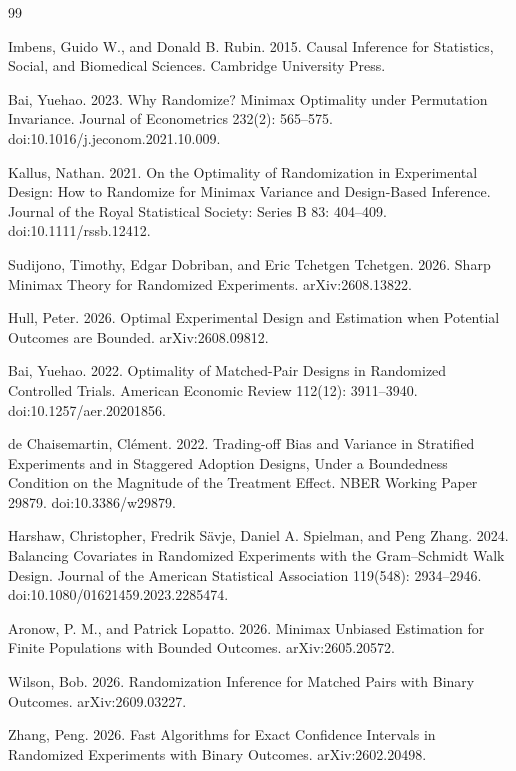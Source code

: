 \documentclass{article}
\begin{document}
\begin{thebibliography}{99}

   Imbens, Guido W., and Donald B. Rubin. 2015. Causal Inference for Statistics, Social, and Biomedical Sciences. Cambridge University Press.

   Bai, Yuehao. 2023. Why Randomize? Minimax Optimality under Permutation Invariance. Journal of Econometrics 232(2): 565--575. doi:10.1016/j.jeconom.2021.10.009.

   Kallus, Nathan. 2021. On the Optimality of Randomization in Experimental Design: How to Randomize for Minimax Variance and Design-Based Inference. Journal of the Royal Statistical Society: Series B 83: 404--409. doi:10.1111/rssb.12412.

   Sudijono, Timothy, Edgar Dobriban, and Eric Tchetgen Tchetgen. 2026. Sharp Minimax Theory for Randomized Experiments. arXiv:2608.13822.

   Hull, Peter. 2026. Optimal Experimental Design and Estimation when Potential Outcomes are Bounded. arXiv:2608.09812.

   Bai, Yuehao. 2022. Optimality of Matched-Pair Designs in Randomized Controlled Trials. American Economic Review 112(12): 3911--3940. doi:10.1257/aer.20201856.

   de Chaisemartin, Clément. 2022. Trading-off Bias and Variance in Stratified Experiments and in Staggered Adoption Designs, Under a Boundedness Condition on the Magnitude of the Treatment Effect. NBER Working Paper 29879. doi:10.3386/w29879.

   Harshaw, Christopher, Fredrik Sävje, Daniel A. Spielman, and Peng Zhang. 2024. Balancing Covariates in Randomized Experiments with the Gram--Schmidt Walk Design. Journal of the American Statistical Association 119(548): 2934--2946. doi:10.1080/01621459.2023.2285474.

   Aronow, P. M., and Patrick Lopatto. 2026. Minimax Unbiased Estimation for Finite Populations with Bounded Outcomes. arXiv:2605.20572.

   Wilson, Bob. 2026. Randomization Inference for Matched Pairs with Binary Outcomes. arXiv:2609.03227.

   Zhang, Peng. 2026. Fast Algorithms for Exact Confidence Intervals in Randomized Experiments with Binary Outcomes. arXiv:2602.20498.


\end{thebibliography}
\end{document}
